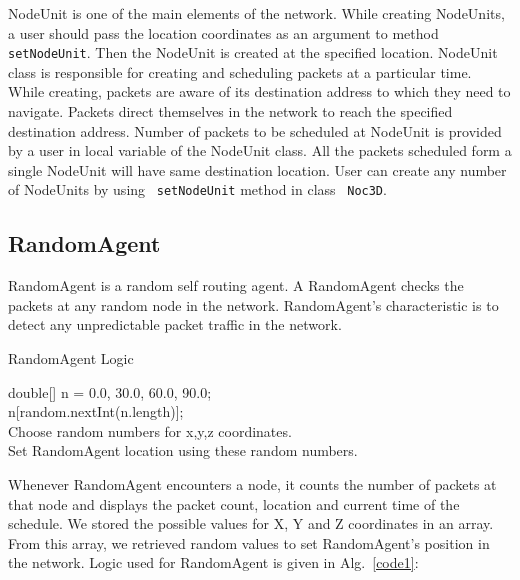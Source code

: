 NodeUnit is one of the main elements of the network. While creating NodeUnits, a user should pass the location coordinates as an argument to method~ \texttt{setNodeUnit}. Then the NodeUnit is created at the specified location. NodeUnit class is responsible for creating and scheduling packets at a particular time. While creating, packets are aware of its destination address to which they need to navigate. Packets direct themselves in the network to reach the specified destination address. Number of packets to be scheduled at NodeUnit is provided by a user in local variable of the NodeUnit class. All the packets scheduled form a single NodeUnit will have same destination location. User can create any number of NodeUnits by using~ \texttt{setNodeUnit} method in class~ \texttt{Noc3D}. 


\subsection{RandomAgent}
\vspace{5mm}

RandomAgent is a random self routing agent. A RandomAgent checks the packets at any random node in the network. RandomAgent's characteristic is to detect any unpredictable packet traffic in the network. 

\vspace{10mm}
\begin{algorithm}[H]
\caption{RandomAgent Logic}
\label{code1}
\begin{boxedminipage}{150mm}
\vspace{5mm}
double[] n = { 0.0, 30.0, 60.0, 90.0};  
 \\
n[random.nextInt(n.length)];       
 \\
Choose random numbers for x,y,z coordinates. \\
Set RandomAgent location using these random numbers.
\vspace{5mm}
\end{boxedminipage}
\end{algorithm}
\vspace{10mm}

Whenever RandomAgent encounters a node, it counts the number of packets at that node and displays the packet count, location and current time of the schedule. We stored the possible values for X, Y and Z coordinates in an array. From this array, we retrieved random values to set RandomAgent's position in the network. Logic used for RandomAgent is given in Alg.~\ref{code1}:


